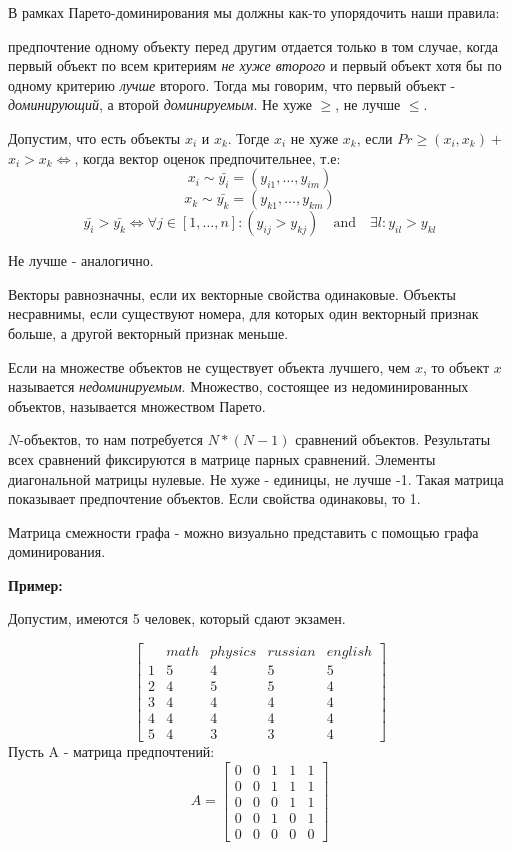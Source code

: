 \documentclass[aps,%
12pt,%
final,%
oneside,
onecolumn,%
musixtex, %
superscriptaddress,%
centertags]{article} %
\begin{document}
В рамках Парето-доминирования мы должны как-то упорядочить наши правила:

предпочтение одному объекту перед другим отдается только в том случае, когда первый объект по всем критериям \textit{не хуже второго} и первый объект хотя бы по одному критерию \textit{лучше} второго. Тогда мы говорим, что первый объект - \textit{доминирующий}, а второй \textit{доминируемым}. Не хуже $\geq$, не лучше $\leq$.

Допустим, что есть объекты $x_i$ и $x_k$. Тогде $x_i$ не хуже $x_k$, если $Pr \geq (x_i,x_k) +$ $x_i > x_k \Leftrightarrow$, когда вектор оценок предпочительнее, т.е:
$$x_i \sim \bar{y_i} = (y_{i1},\ldots,y_{im})$$
$$x_k \sim \bar{y_k} = (y_{k1},\ldots,y_{km})$$
$$\bar{y_i} >  \bar{y_k} \Leftrightarrow \forall j \in [1,\ldots,n]:(y_{ij}>y_{kj}) \quad \text{and}\quad \exists l:y_{il} > y_{kl}$$

Не лучше - аналогично.

Векторы равнозначны, если их векторные свойства одинаковые.
Объекты несравнимы, если существуют номера, для которых один векторный признак больше, а другой векторный признак меньше.

Если на множестве объектов не существует объекта лучшего, чем $x$, то объект $x$ называется \textit{недоминируемым}. Множество, состоящее из недоминированных объектов, называется множеством Парето.

$N$-объектов, то нам потребуется $N*(N-1)$ сравнений объектов.
Результаты всех сравнений фиксируются в матрице парных сравнений. Элементы диагональной матрицы нулевые. Не хуже - единицы, не лучше -1. Такая матрица показывает предпочтение объектов. Если свойства одинаковы, то 1.

Матрица смежности графа - можно визуально представить с помощью графа доминирования.

\textbf{Пример:}

Допустим, имеются 5 человек, который сдают экзамен.

$$
\begin{bmatrix}
	 & math & physics & russian & english \\
	1 & 5 & 4 & 5 & 5 \\
	2 & 4 & 5 & 5 & 4 \\
	3 & 4 & 4 & 4 & 4 \\
	4 & 4 & 4 & 4 & 4 \\
	5 & 4 & 3 & 3 & 4	

\end{bmatrix}$$
Пусть A - матрица предпочтений:
$$ A = 
\begin{bmatrix}
	0 & 0 & 1 & 1 & 1 \\
	0 & 0 & 1 & 1 & 1 \\
	0 & 0 & 0 & 1 & 1 \\
	0 & 0 & 1 & 0 & 1 \\
	0 & 0 & 0 & 0 & 0 
\end{bmatrix}$$
\end{document}
